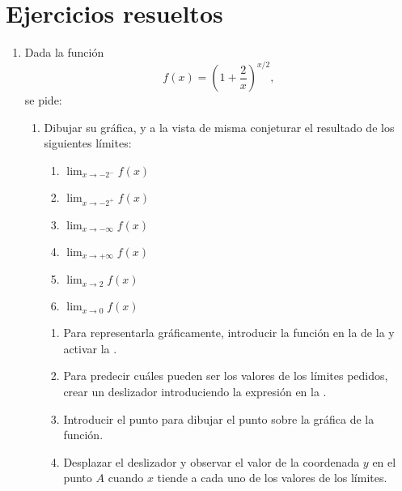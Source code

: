 

\section{Ejercicios resueltos}
\begin{enumerate}[leftmargin=*]
\item Dada la función
      \[
      f(x)=\left( 1+\frac{2}{x}\right) ^{x/2},
      \]
      se pide:

      \begin{enumerate}
      \item Dibujar su gráfica, y a la vista de misma conjeturar el resultado de los siguientes límites:
            \begin{multicols}{2}
            \begin{enumerate}
            \item $\lim_{x\rightarrow -2^-} f(x)$
            \item $\lim_{x\rightarrow -2^+} f(x)$
            \item $\lim_{x\rightarrow -\infty} f(x)$
            \item $\lim_{x\rightarrow +\infty} f(x)$
            \item $\lim_{x\rightarrow 2} f(x)$
            \item $\lim_{x\rightarrow 0} f(x)$
            \end{enumerate}
            \end{multicols}

            \begin{indication}
            \begin{enumerate}
            \item Para representarla gráficamente, introducir la función  en la  de la  y activar la .
            \item Para predecir cuáles pueden ser los valores de los límites pedidos, crear un deslizador introduciendo la expresión  en la .
            \item Introducir el punto  para dibujar el punto sobre la gráfica de la función.
            \item Desplazar el deslizador y observar el valor de la coordenada $y$ en el punto $A$ cuando $x$ tiende a cada uno de los valores de los límites.
            \end{enumerate}
            \end{indication}


\end{enumerate}
\end{enumerate}
